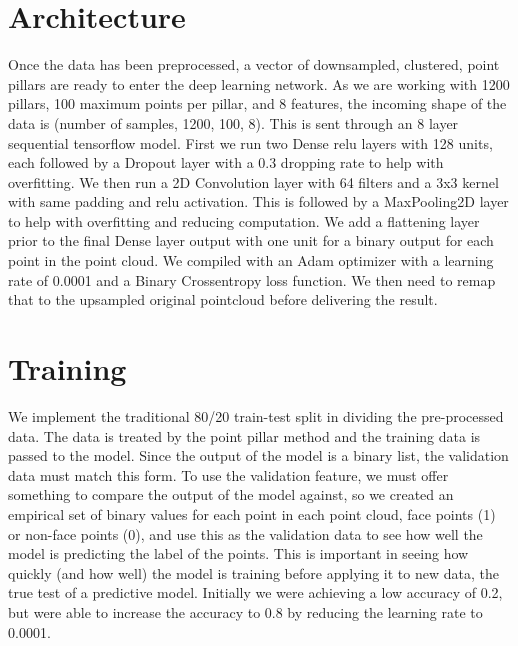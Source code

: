 \documentclass{article}
\begin{document}
\section{Architecture}
Once the data has been preprocessed, a vector of downsampled, clustered, point pillars are ready to enter the deep learning network. As we are working with 1200 pillars, 100 maximum points per pillar, and 8 features, the incoming shape of the data is (number of samples, 1200, 100, 8). This is sent through an 8 layer sequential tensorflow model. First we run two Dense relu layers with 128 units, each followed by a Dropout layer with a 0.3 dropping rate to help with overfitting. We then run a 2D Convolution layer with 64 filters and a 3x3 kernel with same padding and relu activation. This is followed by a MaxPooling2D layer to help with overfitting and reducing computation. We add a flattening layer prior to the final Dense layer output with one unit for a binary output for each point in the point cloud. We compiled with an Adam optimizer with a learning rate of 0.0001 and a Binary Crossentropy loss function. We then need to remap that to the upsampled original pointcloud before delivering the result. 
\section{Training}
We implement the traditional 80/20 train-test split in dividing the pre-processed data. The data is treated by the point pillar method and the training data is passed to the model. Since the output of the model is a binary list, the validation data must match this form. To use the validation feature, we must offer something to compare the output of the model against, so we created an empirical set of binary values for each point in each point cloud, face points (1) or non-face points (0), and use this as the validation data to see how well the model is predicting the label of the points. This is important in seeing how quickly (and how well) the model is training before applying it to new data, the true test of a predictive model. Initially we were achieving a low accuracy of 0.2, but were able to increase the accuracy to 0.8 by reducing the learning rate to 0.0001. 
\end{document}
